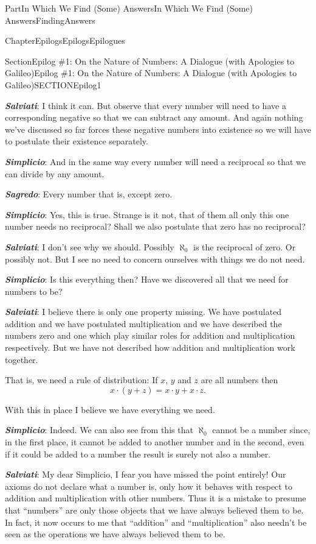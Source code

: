 \documentclass[oneside,10pt,]{book}
\newcommand{\alert}[1]{\textbf{\textit{#1}}}
\numberwithin{equation}{part}
\begin{document}
\begin{partptx}{Part}{In Which We Find (Some) Answers}{}{In Which We Find (Some) Answers}{}{}{FindingAnswers}
\begin{chapterptx}{Chapter}{Epilogs}{}{Epilogs}{}{}{Epilogues}
\begin{sectionptx}{Section}{Epilog \#1: On the Nature of Numbers: A Dialogue (with Apologies to Galileo)}{}{Epilog \#1: On the Nature of Numbers: A Dialogue (with Apologies to Galileo)}{}{}{SECTIONEpilog1}
\par
\alert{Salviati}: I think it can.  But observe that every number will need to have a corresponding negative so that we can subtract any amount.  And again nothing we've discussed so far forces these negative numbers into existence so we will have to postulate their existence separately.%
\par
\alert{Simplicio}:  And in the same way every number will need a reciprocal so that we can divide by any amount.%
\par
\alert{Sagredo}:  Every number that is, except zero.%
\par
\alert{Simplicio}:  Yes, this is true. Strange is it not, that of them all only this one number needs no reciprocal? Shall we also postulate that zero has no reciprocal?%
\par
\alert{Salviati}: I don't see why we should. Possibly \(\aleph_0\) is the reciprocal of zero. Or possibly not. But I see no need to concern ourselves with things we do not need.%
\par
\alert{Simplicio}: Is this everything then? Have we discovered all that we need for numbers to be?%
\par
\alert{Salviati}: I believe there is only one property missing. We have postulated addition and we have postulated multiplication and we have described the numbers zero and one which play similar roles for addition and multiplication respectively. But we have not described how addition and multiplication work together.%
\par
That is, we need a rule of distribution:  If \(x\), \(y\) and \(z\) are all numbers then%
\begin{equation*}
x\cdot(y+z) = x\cdot y+x\cdot z\text{.}
\end{equation*}
%
\par
With this in place I believe we have everything we need.%
\par
\alert{Simplicio}:  Indeed. We can also see from this that \(\aleph_0\) cannot be a number since, in the first place, it cannot be added to another number and in the second, even if it could be added to a number the result is surely not also a number.%
\par
\alert{Salviati}:  My dear Simplicio, I fear you have missed the point entirely! Our axioms do not declare what a number is, only how it behaves with respect to addition and multiplication with other numbers. Thus it is a mistake to presume that ``numbers'' are only those objects that we have always believed them to be. In fact, it now occurs to me that ``addition'' and ``multiplication'' also needn't be seen as the operations we have always believed them to be.%

\end{sectionptx}
\end{chapterptx}
\end{partptx}
\end{document}
